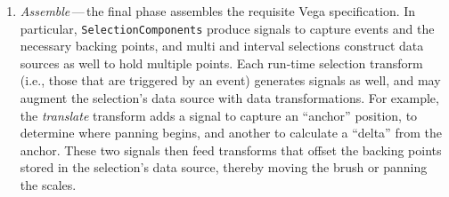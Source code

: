 \begin{enumerate}
  \item \emph{Assemble}\,---\,the final phase assembles the requisite Vega
  specification. In particular, \texttt{SelectionComponents} produce signals to
  capture events and the necessary backing points, and multi and interval
  selections construct data sources as well to hold multiple points. Each
  run-time selection transform (i.e., those that are triggered by an event)
  generates signals as well, and may augment the selection's data source with
  data transformations. For example, the \emph{translate} transform adds a
  signal to capture an ``anchor'' position, to determine where panning begins,
  and another to calculate a ``delta'' from the anchor. These two signals then
  feed transforms that offset the backing points stored in the selection's data
  source, thereby moving the brush or panning the scales.
\end{enumerate}
